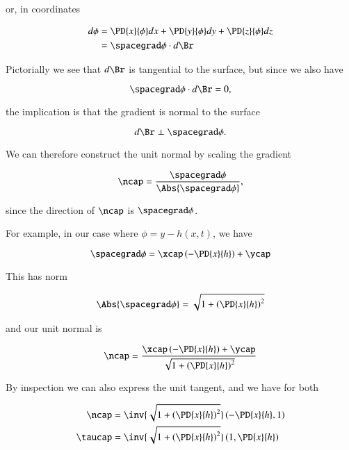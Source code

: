 or, in coordinates

\begin{align*}
d\phi &= 
\PD{x}{\phi} dx
+\PD{y}{\phi} dy
+\PD{z}{\phi} dz \\
&= \spacegrad \phi \cdot d\Br
\end{align*}

Pictorially we see that $d\Br$ is tangential to the surface, but since we also have

\begin{equation}\label{eqn:continuumL13:360}
\spacegrad \phi \cdot d\Br = 0,
\end{equation}

the implication is that the gradient is normal to the surface

\begin{equation}\label{eqn:continuumL13:380}
d\Br \perp \spacegrad \phi.
\end{equation}

We can therefore construct the unit normal by scaling the gradient

\begin{equation}\label{eqn:continuumL13:260}
\ncap = \frac{\spacegrad \phi}{\Abs{\spacegrad \phi}},
\end{equation}

since the direction of $\ncap$ is $\spacegrad \phi$.

For example, in our case where $\phi = y - h(x, t)$, we have

\begin{equation}\label{eqn:continuumL13:280}
\spacegrad \phi = \xcap \left( -\PD{x}{h} \right) + \ycap
\end{equation}

This has norm

\begin{equation}\label{eqn:continuumL13:300}
\Abs{\spacegrad \phi} = \sqrt{ 1 + \left( \PD{x}{h} \right)^2 }
\end{equation}

and our unit normal is

\begin{equation}\label{eqn:continuumL13:320}
\ncap = 
\frac{\xcap \left( -\PD{x}{h} \right) + \ycap}{
\sqrt{ 1 + \left( \PD{x}{h} \right)^2 }
}
\end{equation}

By inspection we can also express the unit tangent, and we have for both

\begin{align}\label{eqn:continuumL13:340}
\ncap &= 
\inv{
\sqrt{ 1 + \left( \PD{x}{h} \right)^2 }
}
\left( -\PD{x}{h}, 1 \right)  \\
\taucap &= 
\inv{
\sqrt{ 1 + \left( \PD{x}{h} \right)^2 }
}
\left( 1, \PD{x}{h} \right)
\end{align}
